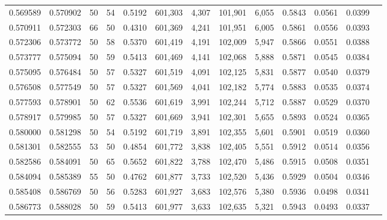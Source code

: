 \begin{tabular}{rrrrrrrrrrrrr}
0.569589 & 0.570902 &    50 &  54 &                                     0.5192 & 601,303 &   4,307 & 101,901 &   6,055 & 0.5843 & 0.0561 & 0.0399 \\
0.570911 & 0.572303 &    66 &  50 &                                     0.4310 & 601,369 &   4,241 & 101,951 &   6,005 & 0.5861 & 0.0556 & 0.0393 \\
0.572306 & 0.573772 &    50 &  58 &                                     0.5370 & 601,419 &   4,191 & 102,009 &   5,947 & 0.5866 & 0.0551 & 0.0388 \\
0.573777 & 0.575094 &    50 &  59 &                                     0.5413 & 601,469 &   4,141 & 102,068 &   5,888 & 0.5871 & 0.0545 & 0.0384 \\
0.575095 & 0.576484 &    50 &  57 &                                     0.5327 & 601,519 &   4,091 & 102,125 &   5,831 & 0.5877 & 0.0540 & 0.0379 \\
0.576508 & 0.577549 &    50 &  57 &                                     0.5327 & 601,569 &   4,041 & 102,182 &   5,774 & 0.5883 & 0.0535 & 0.0374 \\
0.577593 & 0.578901 &    50 &  62 &                                     0.5536 & 601,619 &   3,991 & 102,244 &   5,712 & 0.5887 & 0.0529 & 0.0370 \\
0.578917 & 0.579985 &    50 &  57 &                                     0.5327 & 601,669 &   3,941 & 102,301 &   5,655 & 0.5893 & 0.0524 & 0.0365 \\
0.580000 & 0.581298 &    50 &  54 &                                     0.5192 & 601,719 &   3,891 & 102,355 &   5,601 & 0.5901 & 0.0519 & 0.0360 \\
0.581301 & 0.582555 &    53 &  50 &                                     0.4854 & 601,772 &   3,838 & 102,405 &   5,551 & 0.5912 & 0.0514 & 0.0356 \\
0.582586 & 0.584091 &    50 &  65 &                                     0.5652 & 601,822 &   3,788 & 102,470 &   5,486 & 0.5915 & 0.0508 & 0.0351 \\
0.584094 & 0.585389 &    55 &  50 &                                     0.4762 & 601,877 &   3,733 & 102,520 &   5,436 & 0.5929 & 0.0504 & 0.0346 \\
0.585408 & 0.586769 &    50 &  56 &                                     0.5283 & 601,927 &   3,683 & 102,576 &   5,380 & 0.5936 & 0.0498 & 0.0341 \\
0.586773 & 0.588028 &    50 &  59 &                                     0.5413 & 601,977 &   3,633 & 102,635 &   5,321 & 0.5943 & 0.0493 & 0.0337 \\

\end{tabular}
